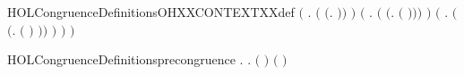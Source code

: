 \begin{SaveVerbatim}{HOLCongruenceDefinitionsOHXXCONTEXTXXdef}
                 \ensuremath{(}\HOLSymConst{\HOLTokenExists{}} . \ensuremath{(} \HOLSymConst{\ensuremath{=}} \ensuremath{(}\HOLTokenLambda{}.  \HOLSymConst{\ensuremath{\mid}}  \ensuremath{)}\ensuremath{)} \HOLSymConst{\HOLTokenConj{}}  \ensuremath{)} \HOLSymConst{\HOLTokenDisj{}}
                 \ensuremath{(}\HOLSymConst{\HOLTokenExists{}} . \ensuremath{(} \HOLSymConst{\ensuremath{=}} \ensuremath{(}\HOLTokenLambda{}.   \ensuremath{(} \ensuremath{)}\ensuremath{)}\ensuremath{)} \HOLSymConst{\HOLTokenConj{}}  \ensuremath{)} \HOLSymConst{\HOLTokenDisj{}}
                 \ensuremath{(}\HOLSymConst{\HOLTokenExists{}} .
                      \ensuremath{(} \HOLSymConst{\ensuremath{=}} \ensuremath{(}\HOLTokenLambda{}.  \ensuremath{(} \ensuremath{)} \ensuremath{)}\ensuremath{)} \HOLSymConst{\HOLTokenConj{}}
                       \ensuremath{)} \HOLSymConst{\HOLTokenImp{}}
                  \ensuremath{)} \HOLSymConst{\HOLTokenImp{}}
             \ensuremath{)}
\end{SaveVerbatim}
\newcommand{\HOLCongruenceDefinitionsOHXXCONTEXTXXdef}{\UseVerbatim{HOLCongruenceDefinitionsOHXXCONTEXTXXdef}}
\begin{SaveVerbatim}{HOLCongruenceDefinitionsprecongruence}
\HOLTokenTurnstile{} \HOLSymConst{\HOLTokenForall{}}.
         \HOLSymConst{\HOLTokenEquiv{}}
         \HOLSymConst{\HOLTokenConj{}}
       \HOLSymConst{\HOLTokenForall{}}  .   \HOLSymConst{\HOLTokenImp{}}    \HOLSymConst{\HOLTokenImp{}}  \ensuremath{(} \ensuremath{)} \ensuremath{(} \ensuremath{)}
\end{SaveVerbatim}
